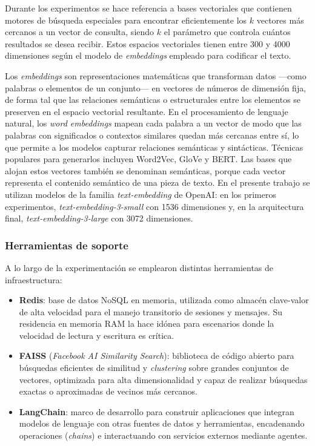 Durante los experimentos se hace referencia a bases vectoriales que contienen motores de búsqueda especiales para encontrar eficientemente los $k$ vectores más cercanos a un vector de consulta, siendo $k$ el parámetro que controla cuántos resultados se desea recibir. Estos espacios vectoriales tienen entre 300 y 4000 dimensiones según el modelo de \textit{embeddings} empleado para codificar el texto.

Los \textit{embeddings} son representaciones matemáticas que transforman datos —como palabras o elementos de un conjunto— en vectores de números de dimensión fija, de forma tal que las relaciones semánticas o estructurales entre los elementos se preserven en el espacio vectorial resultante. En el procesamiento de lenguaje natural, los \textit{word embeddings} mapean cada palabra a un vector de modo que las palabras con significados o contextos similares quedan más cercanas entre sí, lo que permite a los modelos capturar relaciones semánticas y sintácticas. Técnicas populares para generarlos incluyen Word2Vec, GloVe y BERT. Las bases que alojan estos vectores también se denominan semánticas, porque cada vector representa el contenido semántico de una pieza de texto. En el presente trabajo se utilizan modelos de la familia \textit{text-embedding} de OpenAI: en los primeros experimentos, \textit{text-embedding-3-small} con 1536 dimensiones y, en la arquitectura final, \textit{text-embedding-3-large} con 3072 dimensiones.

\subsubsection{Herramientas de soporte}

A lo largo de la experimentación se emplearon distintas herramientas de infraestructura:

\begin{itemize}
	\item \textbf{Redis}: base de datos NoSQL en memoria, utilizada como almacén clave-valor de alta velocidad para el manejo transitorio de sesiones y mensajes. Su residencia en memoria RAM la hace idónea para escenarios donde la velocidad de lectura y escritura es crítica.
	\item \textbf{FAISS} (\textit{Facebook AI Similarity Search}): biblioteca de código abierto para búsquedas eficientes de similitud y \textit{clustering} sobre grandes conjuntos de vectores, optimizada para alta dimensionalidad y capaz de realizar búsquedas exactas o aproximadas de vecinos más cercanos.
	\item \textbf{LangChain}: marco de desarrollo para construir aplicaciones que integran modelos de lenguaje con otras fuentes de datos y herramientas, encadenando operaciones (\textit{chains}) e interactuando con servicios externos mediante agentes.
\end{itemize}

